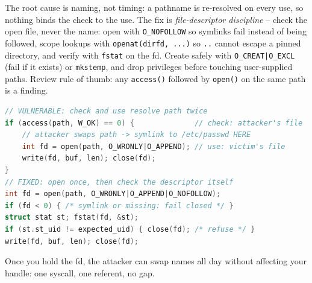 The root cause is naming, not timing: a pathname is re-resolved on every
use, so nothing binds the check to the use. The fix is \emph{file-descriptor
discipline} -- check the open file, never the name: open with
\texttt{O\_NOFOLLOW} so symlinks fail instead of being followed, scope lookups
with \texttt{openat(dirfd, ...)} so \texttt{..} cannot escape a pinned
directory, and verify with \texttt{fstat} on the fd. Create safely with
\texttt{O\_CREAT|O\_EXCL} (fail if it exists) or \texttt{mkstemp}, and drop
privileges before touching user-supplied paths. Review rule of thumb: any
\texttt{access()} followed by \texttt{open()} on the same path is a finding.

\begin{lstlisting}[language=C]
// VULNERABLE: check and use resolve path twice
if (access(path, W_OK) == 0) {              // check: attacker's file
    // attacker swaps path -> symlink to /etc/passwd HERE
    int fd = open(path, O_WRONLY|O_APPEND); // use: victim's file
    write(fd, buf, len); close(fd);
}
// FIXED: open once, then check the descriptor itself
int fd = open(path, O_WRONLY|O_APPEND|O_NOFOLLOW);
if (fd < 0) { /* symlink or missing: fail closed */ }
struct stat st; fstat(fd, &st);
if (st.st_uid != expected_uid) { close(fd); /* refuse */ }
write(fd, buf, len); close(fd);
\end{lstlisting}

Once you hold the fd, the attacker can swap names all day without affecting
your handle: one syscall, one referent, no gap.

